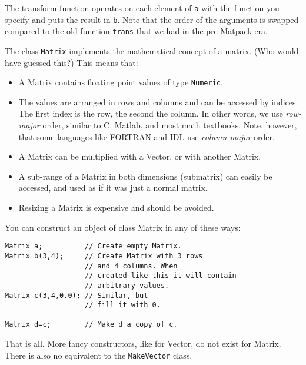 The transform function operates on each element of \verb|a| with the
function you specify and puts the result in \verb|b|. Note that the
order of the arguments is swapped compared to the old function
\verb|trans| that we had in the pre-Matpack era.


\label{sec:matpack:matrices}

The class \verb|Matrix| implements the mathematical concept of a
matrix. (Who would have guessed this?) This means that:
\begin{itemize}
\item A Matrix contains floating point values of type \verb|Numeric|.
\item The values are arranged in rows and columns and can be accessed
  by indices. The first index is the row, the second the column. In
  other words, we use \emph{row-major} order, similar to C, Matlab,
  and most math textbooks. Note, however, that some languages like
  FORTRAN and IDL use \emph{column-major} order.
\item A Matrix can be multiplied with a Vector, or with another
  Matrix.
\item A sub-range of a Matrix in both dimensions (submatrix) can
  easily be accessed, and used as if it was just a normal matrix.
\item Resizing a Matrix is expensive and should be avoided.
\end{itemize}

You can construct an object of class Matrix in any of these ways:

\begin{verbatim}
Matrix a;          // Create empty Matrix.
Matrix b(3,4);     // Create Matrix with 3 rows 
                   // and 4 columns. When
                   // created like this it will contain
                   // arbitrary values.
Matrix c(3,4,0.0); // Similar, but
                   // fill it with 0.

Matrix d=c;        // Make d a copy of c.
\end{verbatim}

That is all. More fancy constructors, like for Vector, do not exist
for Matrix. There is also no equivalent to the \verb|MakeVector|
class. 


